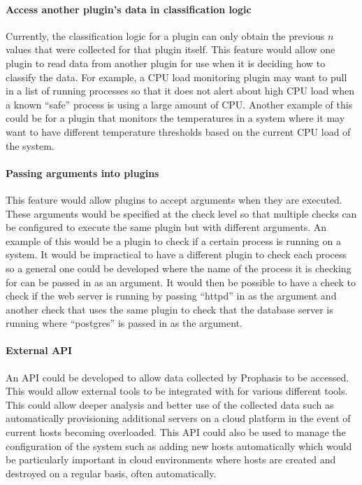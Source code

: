 \documentclass[bsc,deptreport,twoside,parskip,singlespacing,notimes]{infthesis}
\begin{document}
\paragraph*{Access another plugin's data in classification logic}
	Currently, the classification logic for a plugin can only obtain the previous
	$n$ values that were collected for that plugin itself.  This feature would
	allow one plugin to read data from another plugin for use when it is deciding
	how to classify the data.  For example, a CPU load monitoring plugin may want
	to pull in a list of running processes so that it does not alert about high CPU
	load when a known ``safe'' process is using a large amount of CPU. Another
	example of this could be for a plugin that monitors the temperatures in a
	system where it may want to have different temperature thresholds based on the
	current CPU load of the system.

\paragraph*{Passing arguments into plugins}
	This feature would allow plugins to accept arguments when they are executed.
	These arguments would be specified at the check level so that multiple checks
	can be configured to execute the same plugin but with different arguments. An
	example of this would be a plugin to check if a certain process is running on
	a system.  It would be impractical to have a different plugin to check each
	process so a general one could be developed where the name of the process it
	is checking for can be passed in as an argument.  It would then be possible to
	have a check to check if the web server is running by passing ``httpd'' in as the
	argument and another check that uses the same plugin to check that the database
	server is running where ``postgres'' is passed in as the argument.

\paragraph*{External API}
	An API could be developed to allow data collected by Prophasis to be accessed.
	This would allow external tools to be integrated with for various different
	tools.  This could allow deeper analysis and better use of the collected data
	such as automatically provisioning additional servers on a cloud platform in
	the event of current hosts becoming overloaded.  This API could also be used
	to manage the configuration of the system such as adding new hosts
	automatically which would be particularly important in cloud environments where
	hosts are created and destroyed on a regular basis, often automatically.
\end{document}
